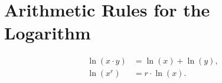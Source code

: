 \section*{Arithmetic Rules for the Logarithm}
\begin{align}
\label{eq:log-sum}
\ln(x\cdot y)&=\ln(x)+\ln(y),\\
\label{eq:log-power}
\ln(x^r)&=r\cdot\ln(x).
\end{align}